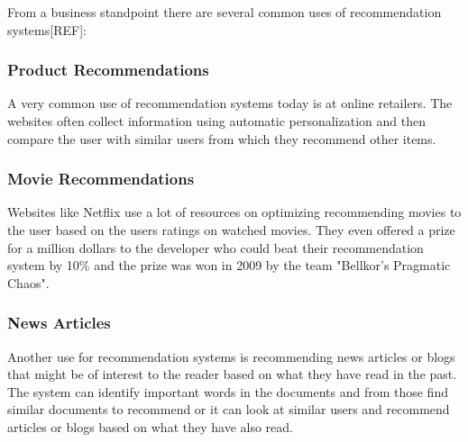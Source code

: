 From a business standpoint there are several common uses of recommendation systems[REF]:

\subsubsection{Product Recommendations}


A very common use of recommendation systems today is at online retailers. The websites often collect information using automatic personalization and then compare the user with similar users from which they recommend other items.


\subsubsection{Movie Recommendations}


Websites like Netflix use a lot of resources on optimizing recommending movies to the user based on the users ratings on watched movies. They even offered a prize for a million dollars to the developer who could beat their recommendation system by 10\% and the prize was won in 2009 by the team "Bellkor's Pragmatic Chaos".


\subsubsection{News Articles}


Another use for recommendation systems is recommending news articles or blogs that might be of interest to the reader based on what they have read in the past. The system can identify important words in the documents and from those find similar documents to recommend or it can look at similar users and recommend articles or blogs based on what they have also read.    
